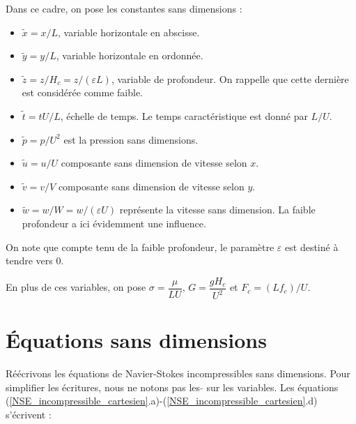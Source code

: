 \documentclass[10pt,a4paper]{amsart}
\begin{document}
Dans ce cadre, on pose les constantes sans dimensions :

\begin{itemize}
\item $ \widetilde{x} = x/L$, variable horizontale en abscisse.

\item $ \widetilde{y} = y/L$, variable horizontale en ordonnée.

\item $ \widetilde{z} = z/H_c = z/(\varepsilon L)$, variable de profondeur. On rappelle que cette dernière est considérée comme faible.

\item $ \widetilde{t} = tU/L$, échelle de temps. Le temps caractéristique est donné par $L/U$.

\item $ \widetilde{p} = p/U^2$ est la pression sans dimensions.

\item $ \widetilde{u} = u/U$ composante sans dimension de vitesse selon $x$.

\item $ \widetilde{v} = v/V$ composante sans dimension de vitesse selon $y$.

\item $ \widetilde{w} = w/W=w/(\varepsilon U)$ représente la vitesse sans dimension. La faible profondeur a ici évidemment une influence.
\end{itemize}

On note que compte tenu de la faible profondeur, le paramètre $\varepsilon$ est destiné à tendre vers 0.

En plus de ces variables, on pose $\sigma = \dfrac{\mu}{LU}$, $G=\dfrac{gH_c}{U^2}$ et $F_c = (L f_c)/U$.

\section{\'Equations sans dimensions}

Réécrivons les équations de Navier-Stokes incompressibles  sans dimensions. Pour simplifier les écritures, nous ne notons pas les $\widetilde{ }$ sur les variables. Les équations (\ref{NSE_incompressible_cartesien}.a)-(\ref{NSE_incompressible_cartesien}.d) s'écrivent :
\end{document}
